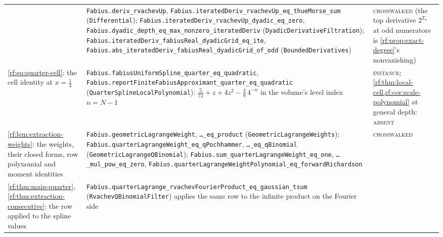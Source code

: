 \documentclass[11pt,oneside]{article}
\theoremstyle{plain}
\theoremstyle{definition}
\theoremstyle{remark}
\newcommand{\Tr}[1]{T_{#1}}                 %
\begin{document}
\begin{center}
\begin{longtable}{@{}>{\raggedright\arraybackslash}p{}>{\raggedright\arraybackslash}p{}>{\raggedright\arraybackslash}p{}@{}}
& \texttt{Fabius.\allowbreak{}deriv\_\allowbreak{}rvachevUp}, \texttt{Fabius.\allowbreak{}iteratedDeriv\_\allowbreak{}rvachevUp\_\allowbreak{}eq\_\allowbreak{}thueMorse\_\allowbreak{}sum} (\texttt{Differential}); \texttt{Fabius.\allowbreak{}iteratedDeriv\_\allowbreak{}rvachevUp\_\allowbreak{}dyadic\_\allowbreak{}eq\_\allowbreak{}zero}, \texttt{Fabius.\allowbreak{}dyadic\_\allowbreak{}depth\_\allowbreak{}eq\_\allowbreak{}max\_\allowbreak{}nonzero\_\allowbreak{}iteratedDeriv} (\texttt{DyadicDerivativeFiltration}); \texttt{Fabius.\allowbreak{}iteratedDeriv\_\allowbreak{}fabiusReal\_\allowbreak{}dyadicGrid\_\allowbreak{}eq\_\allowbreak{}ite}, \texttt{Fabius.\allowbreak{}abs\_\allowbreak{}iteratedDeriv\_\allowbreak{}fabiusReal\_\allowbreak{}dyadicGrid\_\allowbreak{}of\_\allowbreak{}odd} (\texttt{BoundedDerivatives})
& \textsc{crosswalked} (the top derivative $2^{\Tr{n}}$ at odd numerators is \cref{rf:prop:exact-degree}'s nonvanishing)\\[0.3em]
\cref{rf:eq:quarter-cell}: the cell identity at $x=\tfrac14$
& \texttt{Fabius.\allowbreak{}fabiusUniformSpline\_\allowbreak{}quarter\_\allowbreak{}eq\_\allowbreak{}quadratic}, \texttt{Fabius.\allowbreak{}reportFiniteFabiusApproximant\_\allowbreak{}quarter\_\allowbreak{}eq\_\allowbreak{}quadratic} (\texttt{QuarterSplineLocalPolynomial}): $\tfrac5{72}+z+4z^{2}-\tfrac49\,4^{-n}$ in the volume's level index $n=N-1$
& \textsc{instance}; \cref{rf:thm:local-cell,rf:cor:scale-polynomial} at general depth: \textsc{absent}\\[0.3em]
\cref{rf:lem:extraction-weights}: the weights, their closed forms, row polynomial and moment identities
& \texttt{Fabius.\allowbreak{}geometricLagrangeWeight}, \texttt{\ldots\_\allowbreak{}eq\_\allowbreak{}product} (\texttt{GeometricLagrangeWeights}); \texttt{Fabius.\allowbreak{}quarterLagrangeWeight\_\allowbreak{}eq\_\allowbreak{}qPochhammer}, \texttt{\ldots\_\allowbreak{}eq\_\allowbreak{}qBinomial} (\texttt{GeometricLagrangeQBinomial}); \texttt{Fabius.\allowbreak{}sum\_\allowbreak{}quarterLagrangeWeight\_\allowbreak{}eq\_\allowbreak{}one}, \texttt{\ldots\_\allowbreak{}mul\_\allowbreak{}pow\_\allowbreak{}eq\_\allowbreak{}zero}, \texttt{Fabius.\allowbreak{}quarterLagrangeWeightPolynomial\_\allowbreak{}eq\_\allowbreak{}forwardRichardson}
& \textsc{crosswalked}\\[0.3em]
\cref{rf:thm:main-quarter}, \cref{rf:thm:extraction-consecutive}: the row applied to the spline values
& \texttt{Fabius.\allowbreak{}quarterLagrange\_\allowbreak{}rvachevFourierProduct\_\allowbreak{}eq\_\allowbreak{}gaussian\_\allowbreak{}tsum} (\texttt{RvachevQBinomialFilter}) applies the same row to the infinite product on the Fourier side

\end{longtable}
\end{center}
\end{document}
